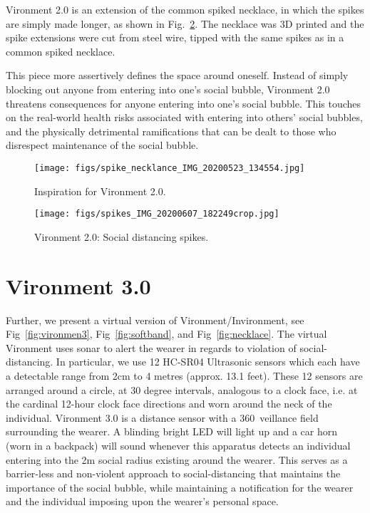 \documentclass[journal]{journal}
\begin{document}
Vironment 2.0 is an extension of the common spiked necklace, in which the spikes are simply made longer, as shown in Fig.~\ref{fig:longspikes}. The necklace was 3D printed and the spike extensions were cut from steel wire, tipped with the same spikes as in a common spiked necklace.

This piece more assertively defines the space around oneself. Instead of simply blocking out anyone from entering into one's social bubble, Vironment 2.0 threatens consequences for anyone entering into one's social bubble. This touches on the real-world health risks associated with entering into others' social bubbles, and the physically detrimental ramifications that can be dealt to those who disrespect maintenance of the social bubble.

\begin{figure}
    \texttt{[image: figs/spike\_necklance\_IMG\_20200523\_134554.jpg]}
    \caption{Inspiration for Vironment 2.0.}
    \label{fig:normal_spike_necklace}
\end{figure}

\begin{figure}
    \texttt{[image: figs/spikes\_IMG\_20200607\_182249crop.jpg]}
    \caption{Vironment 2.0: Social distancing spikes.}
    \label{fig:longspikes}
\end{figure}

\section{Vironment 3.0}
Further, we present a virtual version of Vironment/Invironment, see Fig~\ref{fig:vironmen3}, Fig~\ref{fig:softband}, and Fig~\ref{fig:necklace}.
The virtual Vironment uses sonar to alert the wearer in regards to violation of
social-distancing.  In particular, we use 12 HC-SR04 Ultrasonic sensors which each have a detectable range from 2cm to 4 metres (approx. 13.1 feet).  These 12 sensors are arranged around a circle, at 30 degree intervals, analogous to a clock face, i.e. at the cardinal 12-hour clock face directions and worn around the neck of the individual. Vironment 3.0 is a distance sensor with a 360\degree\ veillance field surrounding the wearer. A blinding bright LED will light up and a car horn (worn in a backpack) will sound whenever this apparatus detects an individual entering into the 2m social radius existing around the wearer. This serves as a barrier-less and non-violent approach to social-distancing that maintains the importance of the social bubble, while maintaining a notification for the wearer and the individual imposing upon the wearer's personal space.
\end{document}
